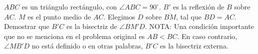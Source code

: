 $ABC$ es un triángulo rectángulo, con $\angle ABC = 90^{\circ}$. $B'$ es la reflexión de $B$ sobre $AC$. $M$ es el punto medio de $AC$. Elegimos $D$ sobre $\overline{BM}$, tal que $BD = AC$. Demostrar que $B'C$ es la bisectriz de $\angle BM'D$.
NOTA: Una condición importante que no se menciona en el problema original es $AB\lt BC$. En caso contrario, $\angle MB'D$ no está definido o en otras palabras, $B'C$ es la bisectriz externa.
